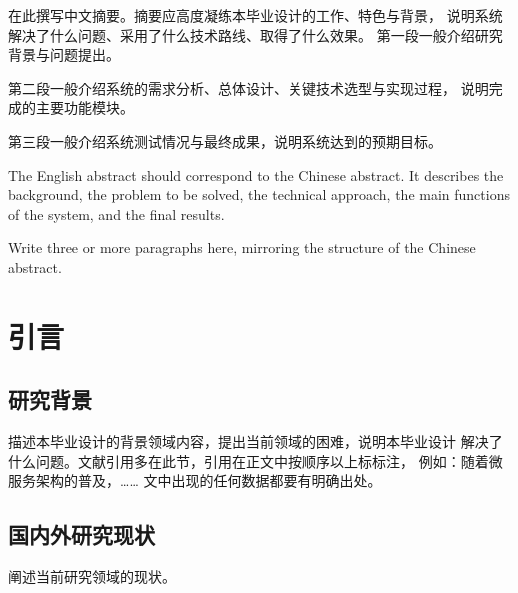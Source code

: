 \documentclass[fandol]{izdthesis}
\begin{document}
\makecover

\makedeclaration

\begin{cnabstract}
  在此撰写中文摘要。摘要应高度凝练本毕业设计的工作、特色与背景，
  说明系统解决了什么问题、采用了什么技术路线、取得了什么效果。
  第一段一般介绍研究背景与问题提出。

  第二段一般介绍系统的需求分析、总体设计、关键技术选型与实现过程，
  说明完成的主要功能模块。

  第三段一般介绍系统测试情况与最终成果，说明系统达到的预期目标。

\end{cnabstract}

\begin{enabstract}
  The English abstract should correspond to the Chinese abstract.
  It describes the background, the problem to be solved, the technical
  approach, the main functions of the system, and the final results.

  Write three or more paragraphs here, mirroring the structure of the
  Chinese abstract.

\end{enabstract}

\izdtableofcontents

\izdmainmatter

\chapter{引言}

\section{研究背景}
描述本毕业设计的背景领域内容，提出当前领域的困难，说明本毕业设计
解决了什么问题。文献引用多在此节，引用在正文中按顺序以上标标注，
例如：随着微服务架构的普及\cite{example2024microservice}，……
文中出现的任何数据都要有明确出处。

\section{国内外研究现状}
阐述当前研究领域的现状。
\end{document}
